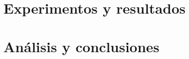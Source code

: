 \documentclass[14pt,letterpaper,hidelinks]{extarticle}
\begin{document}
\section{Experimentos y resultados}
\section{Análisis y conclusiones}


%
%
%

%


\end{document}
